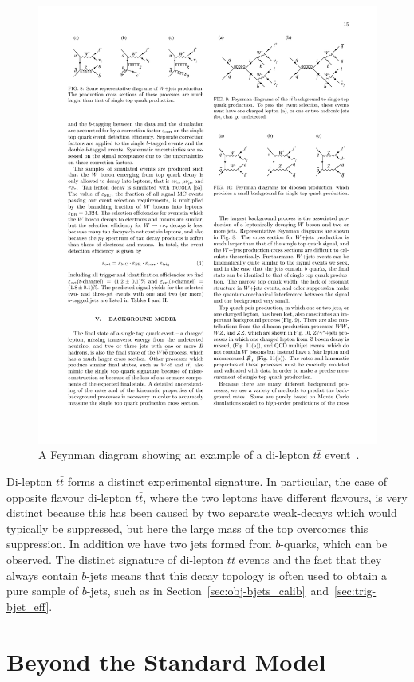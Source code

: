 \begin{figure}[!hbt]
  \begin{center}
    \includegraphics[width=0.7\linewidth, angle=0]{figs/Theory/ttbar.pdf}
  \end{center}
  \caption[A Feynman diagram showing an example of a di-lepton $t\bar{t}$ event.]
  {A Feynman diagram showing an example of a di-lepton $t\bar{t}$ event~\cite{theo-ttbar_feyn}.}
  \label{fig:theo-ttbar}
\end{figure}

Di-lepton $t\bar{t}$ forms a distinct experimental signature.
In particular, the case of opposite flavour di-lepton $t\bar{t}$, where the two leptons have different flavours, is very distinct
because this has been caused by two separate weak-decays which would typically be suppressed,
but here the large mass of the top overcomes this suppression.
In addition we have two jets formed from $b$-quarks, which can be observed.
The distinct signature of di-lepton $t\bar{t}$ events and the fact that they always contain $b$-jets
means that this decay topology is often used to obtain a pure sample of $b$-jets,
such as in Section~\ref{sec:obj-bjets_calib}~and~\ref{sec:trig-bjet_eff}. 

\clearpage
\section{Beyond the Standard Model}
\label{sec:theo-bsm}

